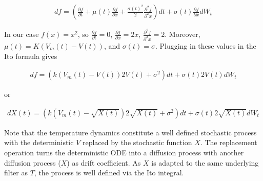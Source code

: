 \begin{align*}
d f = \left(\frac{\partial f}{ \partial t} + \mu(t)\frac{\partial f}{ \partial x} + \frac{\sigma(t)^{2}}{2}\frac{\partial^{2} f}{ \partial^{2} x}\right)dt + \sigma(t)\frac{\partial f}{ \partial x}dW_{t}
\end{align*}

In our case $f(x) = x^{2}$, so $\frac{\partial f}{ \partial t} = 0$, $\frac{\partial f}{ \partial x} = 2x$, $\frac{\partial^{2} f}{ \partial^{2} x} = 2$. Moreover, $\mu(t) = K(V_{m}(t)-V(t))$, and $\sigma(t)=\sigma$.
Plugging in these values in the Ito formula gives

\begin{align*}
d f = ( k(V_{m}(t)-V(t))2V(t) + \sigma^{2})dt + \sigma(t)2V(t)dW_{t}
\end{align*}

or

\begin{align*}
d X(t)= ( k(V_{m}(t)-\sqrt{X(t)})2\sqrt{X(t)} + \sigma^{2})dt + \sigma(t)2\sqrt{X(t)}dW_{t}
\end{align*}

Note that the temperature dynamics constitute a well defined
stochastic process with the deterministic $V$  replaced by the
stochastic function $X$. The replacement operation turns the
deterministic ODE into a diffusion process with another diffusion
process ($X$) as drift coefficient. As $X$ is adapted to the same
underlying filter as $T$, the process is well defined via the Ito
integral.



